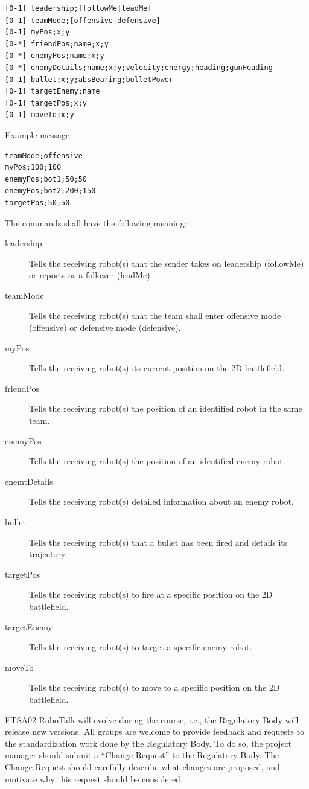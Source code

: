 \documentclass{scrreprt}
\begin{document}
\begin{verbatim}
[0-1] leadership;[followMe|leadMe]
[0-1] teamMode;[offensive|defensive]
[0-1] myPos;x;y
[0-*] friendPos;name;x;y
[0-*] enemyPos;name;x;y
[0-*] enemyDetails;name;x;y;velocity;energy;heading;gunHeading
[0-1] bullet;x;y;absBearing;bulletPower
[0-1] targetEnemy;name
[0-1] targetPos;x;y
[0-1] moveTo;x;y
\end{verbatim}

Example message:

\begin{verbatim}
teamMode;offensive
myPos;100;100
enemyPos;bot1;50;50
enemyPos;bot2;200;150
targetPos;50;50
\end{verbatim}

The commands shall have the following meaning:

\begin{description}
\item[leadership] Tells the receiving robot(s) that the sender takes on leadership (followMe) or reports as a follower (leadMe).
\item[teamMode] Tells the receiving robot(s) that the team shall enter offensive mode (offensive) or defensive mode (defensive).
\item[myPos] Tells the receiving robot(s) its current position on the 2D battlefield.
\item[friendPos] Tells the receiving robot(s) the position of an identified robot in the same team.
\item[enemyPos] Tells the receiving robot(s) the position of an identified enemy robot.
\item[enemtDetails] Tells the receiving robot(s) detailed information about an enemy robot.
\item[bullet] Tells the receiving robot(s) that a bullet has been fired and details its trajectory.
\item[targetPos] Tells the receiving robot(s) to fire at a specific position on the 2D battlefield.
\item[targetEnemy] Tells the receiving robot(s) to target a specific enemy robot.
\item[moveTo] Tells the receiving robot(s) to move to a specific position on the 2D battlefield.
\end{description}

ETSA02 RoboTalk will evolve during the course, i.e., the Regulatory Body will release new versions. All groups are welcome to provide feedback and requests to the standardization work done by the Regulatory Body. To do so, the project manager should submit a ``Change Request'' to the Regulatory Body. The Change Request should carefully describe what changes are proposed, and motivate why this request should be considered.
\end{document}
